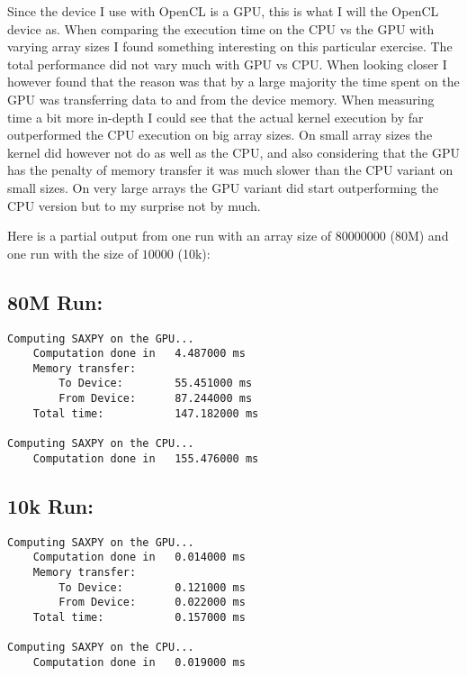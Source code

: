 \documentclass[a4paper, 12pt]{article}
\begin{document}
Since the device I use with OpenCL is a GPU, this is what I will the OpenCL device as. When comparing the execution time on the CPU vs the GPU with varying array sizes I found something interesting on this particular exercise. The total performance did not vary much with GPU vs CPU. When looking closer I however found that the reason was that by a large majority the time spent on the GPU was transferring data to and from the device memory. When measuring time a bit more in-depth I could see that the actual kernel execution by far outperformed the CPU execution on big array sizes. On small array sizes the kernel did however not do as well as the CPU, and also considering that the GPU has the penalty of memory transfer it was much slower than the CPU variant on small sizes. On very large arrays the GPU variant did start outperforming the CPU version but to my surprise not by much.

Here is a partial output from one run with an array size of $80 000 000$ (80M) and one run with the size of $10000$ (10k):

\subsection{80M Run:}
\begin{verbatim}
Computing SAXPY on the GPU...
    Computation done in   4.487000 ms
    Memory transfer:
        To Device:        55.451000 ms
        From Device:      87.244000 ms
    Total time:           147.182000 ms

Computing SAXPY on the CPU...
    Computation done in   155.476000 ms
\end{verbatim}

\subsection{10k Run:}
\begin{verbatim}
Computing SAXPY on the GPU...
    Computation done in   0.014000 ms
    Memory transfer:
        To Device:        0.121000 ms
        From Device:      0.022000 ms
    Total time:           0.157000 ms

Computing SAXPY on the CPU...
    Computation done in   0.019000 ms
\end{verbatim}
\end{document}
